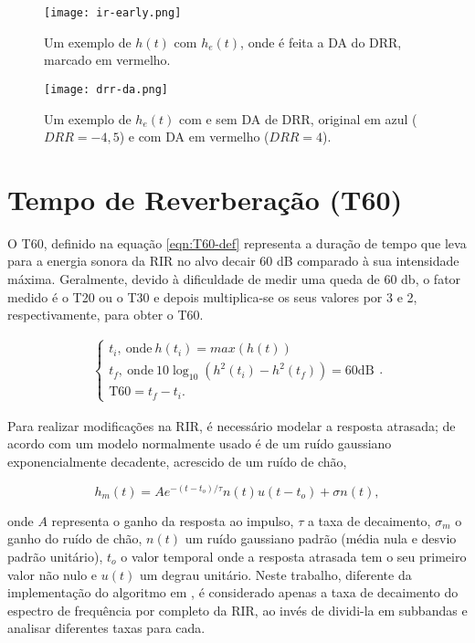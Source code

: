 \begin{figure}[H]
    \centering
    \texttt{[image: ir-early.png]}
    \caption{Um exemplo de $h(t)$ com $h_e(t)$, onde é feita a DA do DRR, marcado em vermelho.}
    \label{fig:ir-early}
\end{figure} 

\begin{figure}[H]
    \centering
    \texttt{[image: drr-da.png]}
    \caption{Um exemplo de $h_e(t)$ com e sem DA de DRR, original em azul ($DRR=-4,5$) e com DA em vermelho ($DRR=4$).}
    \label{fig:drr-da}
\end{figure} 


\section{Tempo de Reverberação (T60)}


O T60, definido na equação \ref{eqn:T60-def} representa a duração de tempo que leva para a energia sonora da RIR
no alvo decair 60 dB comparado à sua intensidade máxima. Geralmente, devido à dificuldade de medir uma queda de 60 db,
o fator medido é o T20 ou o T30 e depois multiplica-se os seus valores por 3 e 2, respectivamente, para obter o T60.

\begin{align} \label{eqn:T60-def}
    \begin{cases}
        t_i, \ \text{onde} \ h(t_i) = max(h(t)) \\
        t_f, \ \text{onde} \ 10 \log_{10} \left( h^2(t_i) - h^2(t_f) \right) = 60 \text{dB} \\
        \text{T60} = t_f-t_i.
    \end{cases}
    .
\end{align}

Para realizar modificações na RIR, é necessário modelar a resposta atrasada; de acordo com \cite{RIR_Data_Aug}
um modelo normalmente usado é de um ruído gaussiano exponencialmente decadente, acrescido de um ruído de chão,

\begin{equation} \label{eqn:h_l-gauss}
    h_m(t) = A e^{-(t - t_o)/ \tau} n(t) u(t - t_o) + \sigma n(t)
    ,
\end{equation}

\noindent
onde $A$ representa o ganho da resposta ao impulso, $\tau$ a taxa de decaimento, $\sigma_m$ o ganho do ruído de chão, 
$n(t)$ um ruído gaussiano padrão (média nula e desvio padrão unitário), $t_o$ o valor temporal onde a resposta atrasada
tem o seu primeiro valor não nulo e $u(t)$ um degrau unitário.
Neste trabalho, diferente da implementação do algoritmo em \cite{RIR_Data_Aug}, é considerado apenas a taxa de decaimento
do espectro de frequência por completo da RIR, ao invés de dividi-la em subbandas e analisar diferentes taxas para cada.

